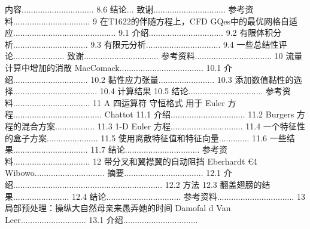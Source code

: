 \documentclass[UTF8,11pt,a4paper,openany,fontset=fandol]{ctexbook}
\begin{document}
内容............................... 8.6 结论... 致谢............................... 参考资料................................. 9 在T1622的伴随方程上，CFD GQes中的最优网格自适应............................................ 9.1 介绍................................ 9.2 有限体积分析................................ 9.3 有限元分析................................ 9.4 一些总结性评论...................... 致谢................................ 参考资料................................. 10 流量计算中增加的消散 MacComack.................................... 10.1 介绍................................ 10.2 黏性应力张量........................ 10.3 添加数值黏性的选择.................................... 10.4 计算结果 10.5 结论................................ 参考资料................................. 11 A 四运算符 守恒格式 用于 Euler 方程...................................... Chattot 11.1 介绍................................ 11.2 Burgers 方程的混合方案................. 11.3 1-D Euler 方程............................... 11.4 一个特征性的盒子方案...................... 11.5 使用离散特征值和特征向量............. 11.6 一些结果................................ 11.7 结论................................ 参考资料................................. 12 带分叉和翼襟翼的自动阻挡 Eberhardt €4 Wibowo.............................. 摘要.................................. 12.1 介绍................................................................ 12.2 方法 12.3 翻盖翅膀的结果........................ 12.4 结论................................ 参考资料................................. 13 局部预处理：操纵大自然母亲来愚弄她的时间 Damofal d Van Leer............................ 13.1 介绍................................
\end{document}
